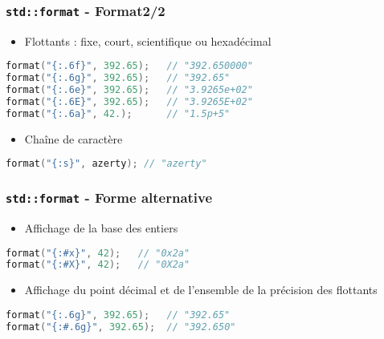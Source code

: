 \documentclass[C++.tex]{subfiles}
\begin{document}
\begin{frame}[fragile]
	\frametitle{\lstinline|std::format| - Format\titlehfill{}2/2}
	\begin{itemize}
		\item Flottants : fixe, court, scientifique ou hexadécimal
	\end{itemize}

	\begin{lstlisting}[language=C++]
format("{:.6f}", 392.65);   // "392.650000"
format("{:.6g}", 392.65);   // "392.65"
format("{:.6e}", 392.65);   // "3.9265e+02"
format("{:.6E}", 392.65);   // "3.9265E+02"
format("{:.6a}", 42.);    	// "1.5p+5"\end{lstlisting}


	\begin{itemize}
		\item Chaîne de caractère
	\end{itemize}

	\begin{lstlisting}[language=C++]
format("{:s}", azerty); // "azerty"\end{lstlisting}
\end{frame}

\begin{frame}[fragile]
	\frametitle{\lstinline|std::format| - Forme alternative}
	\begin{itemize}
		\item Affichage de la base des entiers
	\end{itemize}

	\begin{lstlisting}[language=C++]
format("{:#x}", 42);   // "0x2a"
format("{:#X}", 42);   // "0X2a"\end{lstlisting}

	\begin{itemize}
		\item Affichage du point décimal et de l'ensemble de la précision des flottants
	\end{itemize}

	\begin{lstlisting}[language=C++]
format("{:.6g}", 392.65);   // "392.65"
format("{:#.6g}", 392.65);  // "392.650"\end{lstlisting}
\end{frame}
\end{document}
